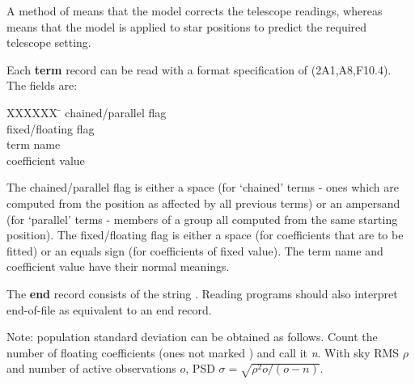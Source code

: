 A method of  means that the model corrects the telescope
readings, whereas  means that the model is applied
to star positions to predict the required telescope setting.

Each {\bf term} record can be read with a format specification of
(2A1,A8,F10.4).  The fields are:

\begin{tabs}
XXXXXX \= \kill
\> chained/parallel flag \\
\> fixed/floating flag \\
\> term name \\
\> coefficient value
\end{tabs}

The chained/parallel flag is either a space (for `chained'
terms - ones which are computed from the position as
affected by all previous terms) or an ampersand (for
`parallel' terms - members of a group all computed
from the same starting position).  The fixed/floating
flag is either a space (for coefficients that are to be
fitted) or an equals sign (for coefficients of fixed
value).  The term name and coefficient value have their
normal meanings.

The {\bf end} record consists of the string .  Reading programs
should also interpret end-of-file as equivalent to an end
record.

Note:  population standard deviation can be obtained as
follows.  Count the number of floating coefficients (ones
not marked \fstring{=}) and call it {\it n}.  With sky RMS $\rho$
and number of active observations $o$,
PSD $\sigma=\sqrt{\rho^{2}o/(o-n)}$.


